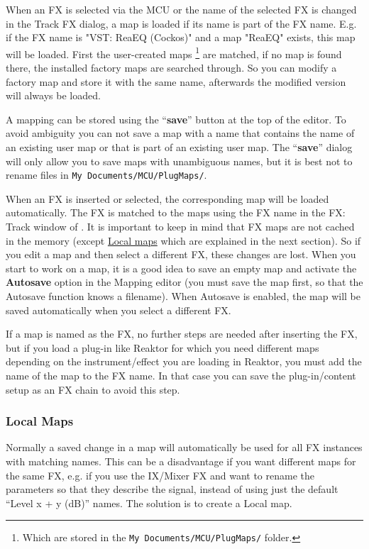 When an FX is selected via the MCU or the name of the selected FX is
changed in the Track FX dialog, a map is loaded if its name is part
of the FX name. E.g.  if the FX name is "VST: ReaEQ (Cockos)" and a
map "ReaEQ" exists, this map will be loaded. First the user-created
maps \footnote{Which are stored in the {\tt My
    Documents/MCU/PlugMaps/} folder.} are matched, if no map is found
there, the installed factory maps are searched through. So you can
modify a factory map and store it with the same name, afterwards the
modified version will always be loaded.

A mapping can be stored using the ``\textbf{save}'' button at the top of the editor. To
avoid ambiguity you can not  save a map with a name that contains the
name of an  existing user map or that is part of an existing user map.
The ``\textbf{save}'' dialog will only allow you to save maps with
unambiguous names, but it is best not to rename files in {\tt My
  Documents/MCU/PlugMaps/}.

When an FX is inserted or selected, the corresponding map will be
loaded automatically. The FX is matched to the maps using the FX name
in the FX: Track window of \reaper. It is important to keep in mind
that FX maps are not cached in the memory (except
\hyperref[localmaps]{Local maps} which are explained in the next
section). So if you edit a map and then select a different FX, these changes are lost. When you start to work on a map, it is a good idea
to save an empty map and activate the \textbf{Autosave} option in the Mapping
editor (you must save the map first, so that the Autosave function
knows a filename). When Autosave is enabled, the map will be saved
automatically when you select a different FX.

If a map is named as the FX, no further steps are needed after
inserting the FX, but if you load a plug-in like Reaktor for which you
need different maps depending on the instrument/effect you are loading
in Reaktor, you must add the name of the map to the FX name. In that
case you can save the plug-in/content setup as an FX chain to avoid
this step.

\subsubsection{Local Maps}\label{localmaps}

Normally a saved change in a map will automatically be used for all FX instances
with matching names. This can be a disadvantage if you want different maps for
the same FX, e.g. if you use the IX/Mixer FX and want to rename the
parameters so that they describe the signal, instead of using just
the default ``Level x + y (dB)'' names. The solution is to create a Local map.

